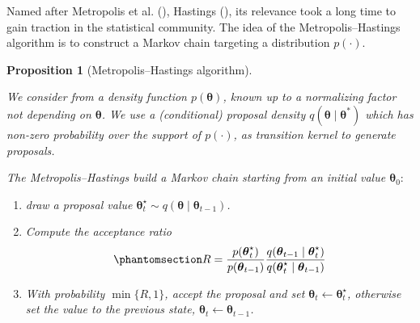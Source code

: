 \documentclass[
  11pt,
  letterpaper,
]{scrbook}
\providecommand{\tightlist}{%
  \setlength{\itemsep}{0pt}\setlength{\parskip}{0pt}}\usepackage{longtable,booktabs,array}
\theoremstyle{definition}
\theoremstyle{definition}
\theoremstyle{definition}
\theoremstyle{plain}
\newtheorem{proposition}{Proposition}[chapter]
\theoremstyle{plain}
\theoremstyle{remark}
\begin{document}
Named after Metropolis et al. (),
Hastings (), its relevance took a long
time to gain traction in the statistical community. The idea of the
Metropolis--Hastings algorithm is to construct a Markov chain targeting
a distribution \(p(\cdot)\).

\begin{proposition}[Metropolis--Hastings
algorithm]\protect\hypertarget{prp-metropolis}{}\label{prp-metropolis}

We consider from a density function \(p(\boldsymbol{\theta})\), known up
to a normalizing factor not depending on \(\boldsymbol{\theta}\). We use
a (conditional) proposal density
\(q(\boldsymbol{\theta} \mid \boldsymbol{\theta}^*)\) which has non-zero
probability over the support of \(p(\cdot)\), as transition kernel to
generate proposals.

The Metropolis--Hastings build a Markov chain starting from an initial
value \(\boldsymbol{\theta}_0:\)

\begin{enumerate}
\def\labelenumi{\arabic{enumi}.}
\tightlist
\item
  draw a proposal value
  \(\boldsymbol{\theta}_t^{\star} \sim q(\boldsymbol{\theta} \mid \boldsymbol{\theta}_{t-1})\).
\item
  Compute the acceptance ratio
  \begin{equation}\phantomsection\label{eq-metropolis-ratio}{
  R = \frac{p(\boldsymbol{\theta}_t^{\star})}{p(\boldsymbol{\theta}_{t-1})}\frac{q(\boldsymbol{\theta}_{t-1} \mid \boldsymbol{\theta}_t^{\star} )}{q(\boldsymbol{\theta}_t^{\star} \mid \boldsymbol{\theta}_{t-1})}
  }\end{equation}
\item
  With probability \(\min\{R, 1\}\), accept the proposal and set
  \(\boldsymbol{\theta}_t \gets \boldsymbol{\theta}_t^{\star}\),
  otherwise set the value to the previous state,
  \(\boldsymbol{\theta}_t \gets \boldsymbol{\theta}_{t-1}\).
\end{enumerate}

\end{proposition}
\end{document}
